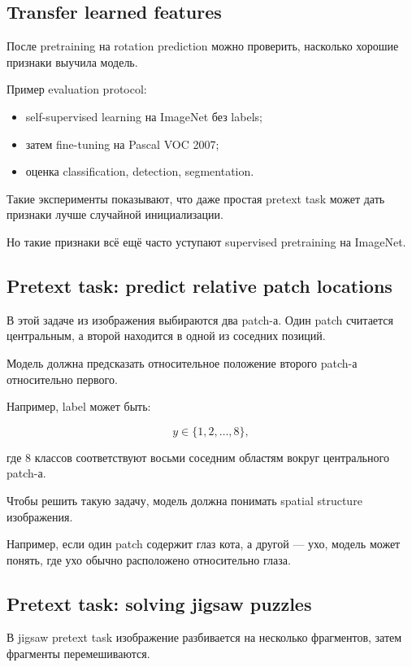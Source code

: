 \documentclass[a4paper,12pt]{article}
\begin{document}
\subsection{Transfer learned features}

После pretraining на rotation prediction можно проверить, насколько хорошие признаки выучила модель.

Пример evaluation protocol:

\begin{itemize}
    \item self-supervised learning на ImageNet без labels;
    \item затем fine-tuning на Pascal VOC 2007;
    \item оценка classification, detection, segmentation.
\end{itemize}

Такие эксперименты показывают, что даже простая pretext task может дать признаки лучше случайной инициализации.

Но такие признаки всё ещё часто уступают supervised pretraining на ImageNet.

\subsection{Pretext task: predict relative patch locations}

В этой задаче из изображения выбираются два patch-а. Один patch считается центральным, а второй находится в одной из соседних позиций.

Модель должна предсказать относительное положение второго patch-а относительно первого.

Например, label может быть:

\[
y \in \{1,2,\dots,8\},
\]

где 8 классов соответствуют восьми соседним областям вокруг центрального patch-а.

Чтобы решить такую задачу, модель должна понимать spatial structure изображения.

Например, если один patch содержит глаз кота, а другой --- ухо, модель может понять, где ухо обычно расположено относительно глаза.

\subsection{Pretext task: solving jigsaw puzzles}

В jigsaw pretext task изображение разбивается на несколько фрагментов, затем фрагменты перемешиваются.
\end{document}
